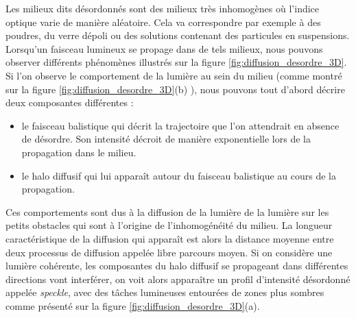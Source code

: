 \documentclass[a4paper,11pt]{article} %
\begin{document}
	Les milieux dits désordonnés sont des milieux très inhomogènes où l'indice optique varie de manière aléatoire. Cela va correspondre par exemple à des poudres, du verre dépoli ou des solutions contenant des particules en suspensions. Lorsqu'un faisceau lumineux se propage dans de tels milieux, nous pouvons observer différents phénomènes illustrés sur la figure \ref{fig:diffusion_desordre_3D}. Si l'on observe le comportement de la lumière au sein du milieu (comme montré sur la figure \ref{fig:diffusion_desordre_3D}(b) ), nous pouvons tout d'abord décrire deux  composantes différentes :
	\begin{itemize}
		\item le faisceau balistique qui décrit la trajectoire que l'on attendrait en absence de désordre. Son intensité décroit de manière exponentielle lors de la propagation dans le milieu.
		\item le halo diffusif qui lui apparaît autour du faisceau balistique au cours de la propagation.
	\end{itemize}
	Ces comportements sont dus à la diffusion de la lumière de la lumière sur les petits obstacles qui sont à l'origine de l'inhomogénéité du milieu. La longueur caractéristique de la diffusion qui apparaît est alors la distance moyenne entre deux processus de diffusion appelée libre parcours moyen. Si on considère une lumière cohérente, les composantes du halo diffusif se propageant dans différentes directions vont interférer, on voit alors apparaître un profil d'intensité désordonné appelée \textit{speckle}, avec des tâches lumineuses entourées de zones plus sombres comme présenté sur la figure \ref{fig:diffusion_desordre_3D}(a).\\
	
\end{document}
